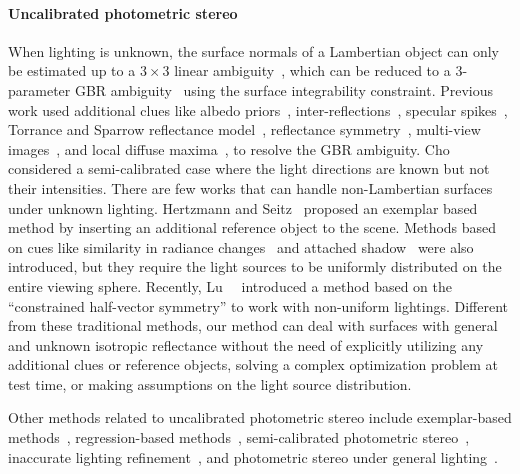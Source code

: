 \paragraph{Uncalibrated photometric stereo}
When lighting is unknown, the surface normals of a Lambertian object can only be estimated up to a $3\times 3$ linear ambiguity~\cite{hayakawa1994photometric}, which can be reduced to a $3$-parameter GBR ambiguity~\cite{belhumeur1999bas,yuille1999determining} using the surface integrability constraint. Previous work used additional clues like albedo priors~\cite{alldrin2007r,shi2010self}, inter-reflections~\cite{chandraker2005reflections}, specular spikes~\cite{drbohlav2005can}, Torrance and Sparrow reflectance model~\cite{georghiades2003incorporating}, reflectance symmetry~\cite{tan2007isotropy,wu2013calib}, multi-view images~\cite{esteban2008multiview}, and local diffuse maxima~\cite{papad14closed}, to resolve the GBR ambiguity. Cho~\etal~\cite{cho2016photometric} considered a semi-calibrated case where the light directions are known but not their intensities. There are few works that can handle non-Lambertian surfaces under unknown lighting. Hertzmann and Seitz~\cite{hertzmann2005example} proposed an exemplar based method by inserting an additional reference object to the scene. Methods based on cues like similarity in radiance changes~\cite{sato2007shape,lu2013uncalibrated} and attached shadow~\cite{okabe2009attached} were also introduced, but they require the light sources to be uniformly distributed on the entire viewing sphere. Recently, Lu~\etal~\cite{lu2018symps} introduced a method based on the ``constrained half-vector symmetry'' to work with non-uniform lightings. Different from these traditional methods, our method can deal with surfaces with general and unknown isotropic reflectance without the need of explicitly utilizing any additional clues or reference objects, solving a complex optimization problem at test time, or making assumptions on the light source distribution. 

Other methods related to uncalibrated photometric stereo include exemplar-based methods~\cite{hertzmann2005example}, regression-based methods~\cite{midorikawa2016uncalibrated}, semi-calibrated photometric stereo~\cite{cho2018semi}, inaccurate lighting refinement~\cite{queau2017non}, and photometric stereo under general lighting~\cite{basri2007photometric,mo2018uncalibrated,haefner2019variational}.

